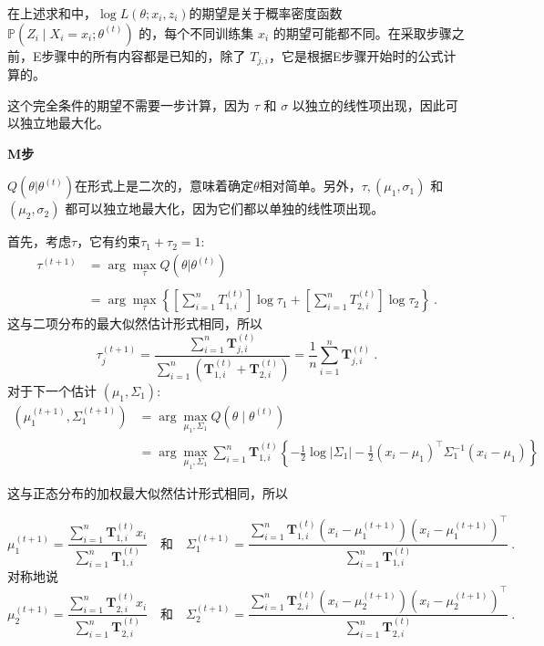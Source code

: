 在上述求和中，$\log L(\theta; x_i, z_i)$的期望是关于概率密度函数 $\mathbb{P}(Z_i \mid X_i = x_i; \theta^{(t)})$ 的，每个不同训练集 $x_i$ 的期望可能都不同。在采取步骤之前，E步骤中的所有内容都是已知的，除了 $T_{j,i}$，它是根据E步骤开始时的公式计算的。

这个完全条件的期望不需要一步计算，因为 $\tau$ 和 $\sigma$ 以独立的线性项出现，因此可以独立地最大化。

\textbf{M步}

$Q(\theta | \theta^{(t)})$在形式上是二次的，意味着确定$\theta$相对简单。另外，$\tau, (\mu_1, \sigma_1)$ 和 $(\mu_2, \sigma_2)$ 都可以独立地最大化，因为它们都以单独的线性项出现。

首先，考虑$\tau$，它有约束$\tau_1 + \tau_2 = 1$:
\begin{equation}
\begin{aligned}
\tau^{(t+1)} &= \arg \max_{\tau} Q(\theta | \theta^{(t)}) \\\\
&= \arg \max_{\tau} \left\{ \left[ \sum_{i=1}^n T_{1,i}^{(t)} \right] \log \tau_1 + \left[ \sum_{i=1}^n T_{2,i}^{(t)} \right] \log \tau_2 \right\}~.
\end{aligned}
\end{equation}
这与二项分布的最大似然估计形式相同，所以
$$\tau_j^{(t+1)} = \frac{\sum_{i=1}^n \mathbf{T}_{j,i}^{(t)}}{\sum_{i=1}^n (\mathbf{T}_{1,i}^{(t)} + \mathbf{T}_{2,i}^{(t)})} = \frac{1}{n} \sum_{i=1}^n \mathbf{T}_{j,i}^{(t)}~.$$
对于下一个估计 $(\mu_1, \Sigma_1)$:
\begin{align}
(\mu_1^{(t+1)}, \Sigma_1^{(t+1)}) &= \arg \max_{\mu_1, \Sigma_1} Q(\theta \mid \theta^{(t)})\\
&= \arg \max_{\mu_1, \Sigma_1} \sum_{i=1}^n \mathbf{T}_{1,i}^{(t)} \left\{ -\frac{1}{2} \log |\Sigma_1| - \frac{1}{2} (x_i - \mu_1)^\top \Sigma_1^{-1} (x_i - \mu_1) \right\}~
\end{align}

这与正态分布的加权最大似然估计形式相同，所以

$$\mu_1^{(t+1)} = \frac{\sum_{i=1}^n \mathbf{T}_{1,i}^{(t)} x_i}{\sum_{i=1}^n \mathbf{T}_{1,i}^{(t)}}\quad \text{和} \quad\Sigma_1^{(t+1)} = \frac{\sum_{i=1}^n \mathbf{T}_{1,i}^{(t)} (x_i - \mu_1^{(t+1)}) (x_i - \mu_1^{(t+1)})^\top}{\sum_{i=1}^n \mathbf{T}_{1,i}^{(t)}}~.$$
对称地说
$$\mu_2^{(t+1)} = \frac{\sum_{i=1}^n \mathbf{T}_{2,i}^{(t)} x_i}{\sum_{i=1}^n \mathbf{T}_{2,i}^{(t)}}\quad \text{和} \quad\Sigma_2^{(t+1)} = \frac{\sum_{i=1}^n \mathbf{T}_{2,i}^{(t)} (x_i - \mu_2^{(t+1)}) (x_i - \mu_2^{(t+1)})^\top}{\sum_{i=1}^n \mathbf{T}_{2,i}^{(t)}}~.$$

